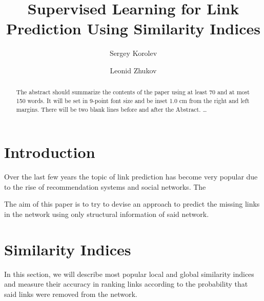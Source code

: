 \documentclass{llncs}
\begin{document}
%
\title{Supervised Learning for Link Prediction Using Similarity Indices}
%
%
\author{Sergey Korolev \and Leonid Zhukov}
%
%
%

\maketitle              %

\begin{abstract}
The abstract should summarize the contents of the paper
using at least 70 and at most 150 words. It will be set in 9-point
font size and be inset 1.0 cm from the right and left margins.
There will be two blank lines before and after the Abstract. \dots
{}
\end{abstract}
%
\section{Introduction}
%
Over the last few years the topic of link prediction has become very popular due to the rise of recommendation systems and social networks. The 

The aim of this paper is to try to devise an approach to predict the missing links in the network using only structural information of said network.
%
\section{Similarity Indices}
%
In this section, we will describe most popular local and global similarity indices and measure their accuracy in ranking links according to the probability that said links were removed from the network.
\end{document}
